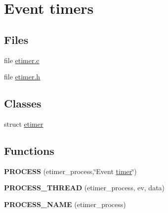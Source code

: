 \hypertarget{group__etimer}{\section{Event timers}
\label{group__etimer}
}
\subsection*{Files}
\begin{DoxyCompactItemize}
\item 
file \hyperlink{etimer_8c}{etimer.\-c}
\item 
file \hyperlink{etimer_8h}{etimer.\-h}
\end{DoxyCompactItemize}
\subsection*{Classes}
\begin{DoxyCompactItemize}
\item 
struct \hyperlink{structetimer}{etimer}
\end{DoxyCompactItemize}
\subsection*{Functions}
\begin{DoxyCompactItemize}
\item 
\hypertarget{group__etimer_ga7b4deba6dec820808d556b9f611ed610}{{\bfseries P\-R\-O\-C\-E\-S\-S} (etimer\-\_\-process,\char`\"{}Event \hyperlink{structtimer}{timer}\char`\"{})}\label{group__etimer_ga7b4deba6dec820808d556b9f611ed610}

\item 
\hypertarget{group__etimer_ga045d36807a20508f3dfea0a618e23ca7}{{\bfseries P\-R\-O\-C\-E\-S\-S\-\_\-\-T\-H\-R\-E\-A\-D} (etimer\-\_\-process, ev, data)}\label{group__etimer_ga045d36807a20508f3dfea0a618e23ca7}

\item 
\hypertarget{group__etimer_ga1439dbb6e50928b95cf90a1a1fbec80b}{{\bfseries P\-R\-O\-C\-E\-S\-S\-\_\-\-N\-A\-M\-E} (etimer\-\_\-process)}\label{group__etimer_ga1439dbb6e50928b95cf90a1a1fbec80b}

\end{DoxyCompactItemize}

